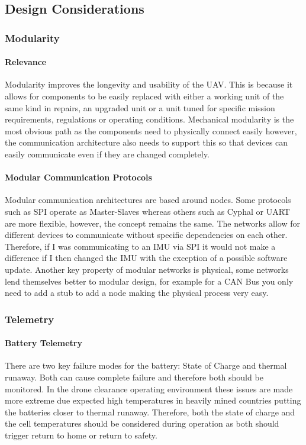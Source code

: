 \subsection{Design Considerations}

\subsubsection{Modularity}
\paragraph{Relevance}
Modularity improves the longevity and usability of the \gls{UAV}. This is because it allows for components to be easily replaced with either a working unit of the same kind in repairs, an upgraded unit or a unit tuned for specific mission requirements, regulations or operating conditions. Mechanical modularity is the most obvious path as the components need to physically connect easily however, the communication architecture also needs to support this so that devices can easily communicate even if they are changed completely.
\paragraph{Modular Communication Protocols}
Modular communication architectures are based around nodes. Some protocols such as \gls{SPI} operate as Master-Slaves whereas others such as Cyphal or \gls{UART} are more flexible, however, the concept remains the same. The networks allow for different devices to communicate without specific dependencies on each other. Therefore, if I was communicating to an \gls{IMU} via \gls{SPI} it would not make a difference if I then changed the \gls{IMU} with the exception of a possible software update. Another key property of modular networks is physical, some networks lend themselves better to modular design, for example for a \gls{CAN} Bus you only need to add a stub to add a node making the physical process very easy.

\subsubsection{Telemetry}
\paragraph{Battery Telemetry}
There are two key failure modes for the battery: State of Charge and thermal runaway. Both can cause complete failure and therefore both should be monitored. In the drone clearance operating environment these issues are made more extreme due expected high temperatures in heavily mined countries putting the batteries closer to thermal runaway. Therefore, both the state of charge and the cell temperatures should be considered during operation as both should trigger return to home or return to safety. 
